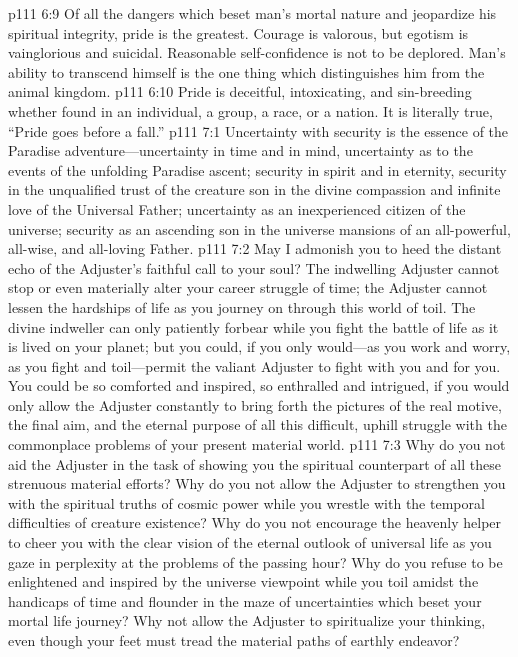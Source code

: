 \pc \vs p111 6:9 Of all the dangers which beset man’s mortal nature and jeopardize his spiritual integrity, pride is the greatest. Courage is valorous, but egotism is vainglorious and suicidal. Reasonable self\hyp{}confidence is not to be deplored. Man’s ability to transcend himself is the one thing which distinguishes him from the animal kingdom.
\pc \vs p111 6:10 Pride is deceitful, intoxicating, and sin\hyp{}breeding whether found in an individual, a group, a race, or a nation. It is literally true, “Pride goes before a fall.”
\vs p111 7:1 Uncertainty with security is the essence of the Paradise adventure---uncertainty in time and in mind, uncertainty as to the events of the unfolding Paradise ascent; security in spirit and in eternity, security in the unqualified trust of the creature son in the divine compassion and infinite love of the Universal Father; uncertainty as an inexperienced citizen of the universe; security as an ascending son in the universe mansions of an all\hyp{}powerful, all\hyp{}wise, and all\hyp{}loving Father.
\pc \vs p111 7:2 May I admonish you to heed the distant echo of the Adjuster’s faithful call to your soul? The indwelling Adjuster cannot stop or even materially alter your career struggle of time; the Adjuster cannot lessen the hardships of life as you journey on through this world of toil. The divine indweller can only patiently forbear while you fight the battle of life as it is lived on your planet; but you could, if you only would---as you work and worry, as you fight and toil---permit the valiant Adjuster to fight with you and for you. You could be so comforted and inspired, so enthralled and intrigued, if you would only allow the Adjuster constantly to bring forth the pictures of the real motive, the final aim, and the eternal purpose of all this difficult, uphill struggle with the commonplace problems of your present material world.
\vs p111 7:3 Why do you not aid the Adjuster in the task of showing you the spiritual counterpart of all these strenuous material efforts? Why do you not allow the Adjuster to strengthen you with the spiritual truths of cosmic power while you wrestle with the temporal difficulties of creature existence? Why do you not encourage the heavenly helper to cheer you with the clear vision of the eternal outlook of universal life as you gaze in perplexity at the problems of the passing hour? Why do you refuse to be enlightened and inspired by the universe viewpoint while you toil amidst the handicaps of time and flounder in the maze of uncertainties which beset your mortal life journey? Why not allow the Adjuster to spiritualize your thinking, even though your feet must tread the material paths of earthly endeavor?
